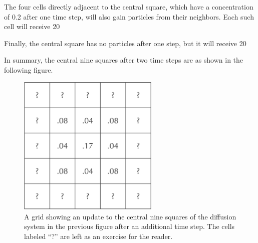 {The four cells directly adjacent to the central square, which have a concentration of 0.2 after one time step, will also gain particles from their neighbors. Each such cell will receive 20%

Finally, the central square has no particles after one step, but it will receive 20%

In summary, the central nine squares after two time steps are as shown in the following figure.

\begin{figure}[h]
\centering
\mySfFamily
\includegraphics[width = 0.6\textwidth]{../images/A_concentration_two_time_steps_partial.png}
\caption{A grid showing an update to the central nine squares of the diffusion system in the previous figure after an additional time step. The cells labeled ``?'' are left as an exercise for the reader.}
\label{fig:A_concentration_two_time_steps_partial}
\end{figure}

\begin{qbox}\end{qbox}


}
